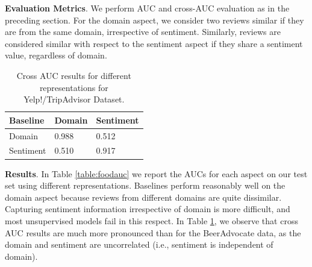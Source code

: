 \documentclass[11pt,a4paper]{article}
\begin{document}
\vspace{.2em}
\noindent \textbf{Evaluation Metrics}. We perform AUC and cross-AUC evaluation as in the preceding section. For the domain aspect, we consider two reviews similar if they are from the same domain, irrespective of sentiment. Similarly, reviews are considered similar with respect to the sentiment aspect if they share a sentiment value, regardless of domain.






\begin{table}%
\footnotesize
    \centering
    \begin{tabularx}{\columnwidth}{l X X}
     Baseline & Domain & Sentiment  \\
    \hline
    Domain & 0.988 & 0.512   \\
    Sentiment & 0.510 & 0.917  \\
    \end{tabularx}
    \caption{Cross AUC results for different representations for Yelp!/TripAdvisor Dataset.}
    \label{table:foodcrossauc}
\end{table}

\vspace{.25em}
\noindent  \textbf{Results}. In Table \ref{table:foodauc} we report the AUCs for each aspect on our test set using different representations. Baselines perform reasonably well on the domain aspect because reviews from different domains are quite dissimilar. Capturing sentiment information irrespective of domain is more difficult, and most unsupervised models fail in this respect. In Table \ref{table:foodcrossauc}, we observe that cross AUC results are much more pronounced than for the BeerAdvocate data, as the domain and sentiment are uncorrelated (i.e., sentiment is independent of domain).
\end{document}

